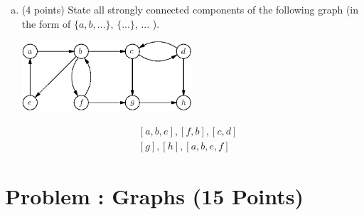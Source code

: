 \documentclass[12pt]{amsart}
\newcounter{pNum}
\newcommand{\problem}[2]{\addtocounter{pNum}{1}
\section*{Problem \arabic{pNum}: #1 (#2 Points)}}
\begin{document}
\begin{enumerate}[(a)]
\item (4 points)
State all strongly connected components of the following graph (in the form of $\{a,b,...\}$, $\{...\}$, ... ).
\vspace{2mm}

\begin{center}
\includegraphics[width=0.5\textwidth]{fig_2c.eps}
\end{center}



\end{enumerate}
\begin{align*}
& [a,b,e], [f,b], [c,d]\\
&[g], [h], [a,b,e,f]
\end{align*}

\newpage



\problem{Graphs}{15}
\end{document}
